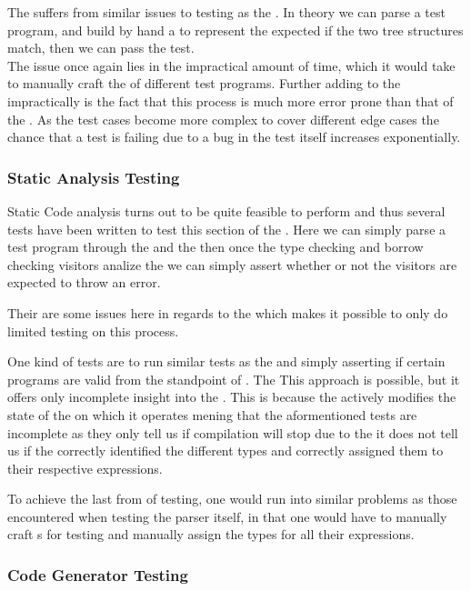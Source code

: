 The \parser{} suffers from similar issues to testing as the \lexer. In theory we can
parse a test program, and build by hand a \ast{} to represent the expected \ast{}
if the two tree structures match, then we can pass the test. \\ 

The issue once again lies in the impractical amount of time, which it would take to
manually craft the \ast{} of different test programs. Further adding to the
impractically is the fact that this process is much more error prone than that of the
\lexer. As the test cases become more complex to cover different edge cases the
chance that a test is failing due to a bug in the test itself increases
exponentially.

\subsubsection{Static Analysis Testing}
\label{sec:testStatic}

Static Code analysis turns out to be quite feasible to perform and thus several tests
have been written to test this section of the \static. Here we can simply parse a
test program through the \lexer{} and the \parser{} then once the type checking and
borrow checking visitors analize the \ast{} we can simply assert whether or not the
visitors are expected to throw an error.

Their are some issues here in regards to the \typeChecker{} which makes it possible
to only do limited testing on this process. 

One kind of tests are to run similar tests as the \borrowChecker{} and simply
asserting if certain programs are valid from the standpoint of \typeChecker. The
This approach is possible, but it offers only incomplete insight into the
\typeChecker{}. This is because the \typeChecker actively modifies the state of the
\ast{} on which it operates mening that the aformentioned tests are incomplete as
they only tell us if compilation will stop due to the \typeChecker{} it does not tell
us if the \typeChecker{} correctly identified the different types and correctly
assigned them to their respective expressions.

To achieve the last from of testing, one would run into similar problems as those
encountered when testing the parser itself, in that one would have to manually craft
\ast s for testing and manually assign the types for all their expressions.

\subsubsection{Code Generator Testing}

